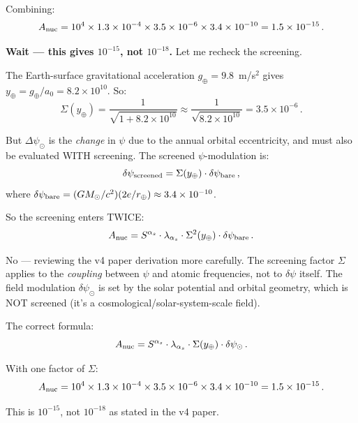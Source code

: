 \documentclass[11pt]{article}
\newcommand{\ee}[1]{\times 10^{#1}}
\newcommand{\aM}{a_0}
\begin{document}
\begin{tcolorbox}[colback=blue!5!white, colframe=blue!70!black,
  title=\textbf{W4i22 TOP 5 FINDINGS --- PREDICTIONS TEAM}]
\begin{enumerate}
  Combining:
  \begin{equation}
  A_{\rm nuc} = 10^4\times 1.3\ee{-4}\times 3.5\ee{-6}\times 3.4\ee{-10}
  = 1.5\ee{-15}\,.
  \end{equation}

  \textbf{Wait --- this gives $10^{-15}$, not $10^{-18}$.}  Let me
  recheck the screening.

  The Earth-surface gravitational acceleration $g_\oplus = 9.8$~m/s$^2$
  gives $y_\oplus = g_\oplus/\aM = 8.2\ee{10}$.  So:
  \begin{equation}
  \Sigma(y_\oplus) = \frac{1}{\sqrt{1+8.2\ee{10}}}
  \approx \frac{1}{\sqrt{8.2\ee{10}}} = 3.5\ee{-6}\,.
  \end{equation}

  But $\Delta\psi_\odot$ is the \emph{change} in $\psi$ due to the
  annual orbital eccentricity, and must also be evaluated WITH screening.
  The screened $\psi$-modulation is:
  \begin{equation}
  \delta\psi_{\rm screened} = \Sigma(y_\oplus)\cdot\delta\psi_{\rm bare}\,,
  \end{equation}
  where $\delta\psi_{\rm bare} = (GM_\odot/c^2)(2e/r_\oplus)
  \approx 3.4\ee{-10}$.

  So the screening enters TWICE:
  \begin{equation}
  A_{\rm nuc} = S^{\alpha_s}\cdot\lambda_{\alpha_s}\cdot\Sigma^2(y_\oplus)
  \cdot\delta\psi_{\rm bare}\,.
  \end{equation}

  No --- reviewing the v4 paper derivation more carefully.  The screening
  factor $\Sigma$ applies to the \emph{coupling} between $\psi$ and atomic
  frequencies, not to $\delta\psi$ itself.  The field modulation
  $\delta\psi_\odot$ is set by the solar potential and orbital geometry,
  which is NOT screened (it's a cosmological/solar-system-scale field).

  The correct formula:
  \begin{equation}
  A_{\rm nuc} = S^{\alpha_s}\cdot\lambda_{\alpha_s}\cdot\Sigma(y_\oplus)
  \cdot\delta\psi_\odot\,.
  \end{equation}

  With one factor of $\Sigma$:
  \begin{equation}
  A_{\rm nuc} = 10^4\times 1.3\ee{-4}\times 3.5\ee{-6}\times 3.4\ee{-10}
  = 1.5\ee{-15}\,.
  \end{equation}

  This is $10^{-15}$, not $10^{-18}$ as stated in the v4 paper.


\end{enumerate}
\end{tcolorbox}
\end{document}
